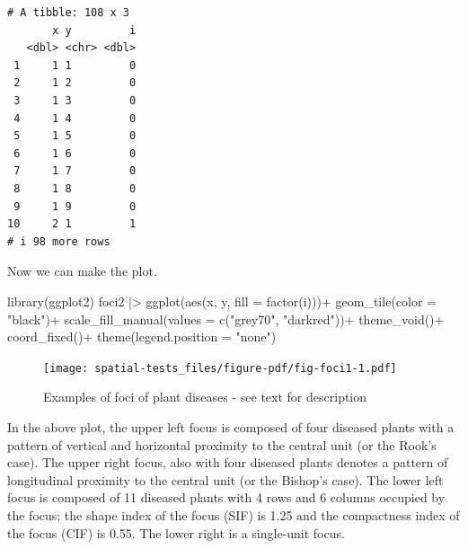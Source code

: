 \documentclass[
  letterpaper,
]{book}
\newenvironment{Shaded}{\begin{snugshade}}{\end{snugshade}}
\newcommand{\AttributeTok}[1]{\textcolor[rgb]{0.40,0.45,0.13}{#1}}
\newcommand{\FunctionTok}[1]{\textcolor[rgb]{0.28,0.35,0.67}{#1}}
\newcommand{\NormalTok}[1]{\textcolor[rgb]{0.00,0.23,0.31}{#1}}
\newcommand{\SpecialCharTok}[1]{\textcolor[rgb]{0.37,0.37,0.37}{#1}}
\newcommand{\StringTok}[1]{\textcolor[rgb]{0.13,0.47,0.30}{#1}}
\begin{document}
\begin{verbatim}
# A tibble: 108 x 3
       x y         i
   <dbl> <chr> <dbl>
 1     1 1         0
 2     1 2         0
 3     1 3         0
 4     1 4         0
 5     1 5         0
 6     1 6         0
 7     1 7         0
 8     1 8         0
 9     1 9         0
10     2 1         1
# i 98 more rows
\end{verbatim}

Now we can make the plot.

\begin{Shaded}
\begin{Highlighting}[]
\FunctionTok{library}\NormalTok{(ggplot2)}
\NormalTok{foci2 }\SpecialCharTok{|\textgreater{}} 
  \FunctionTok{ggplot}\NormalTok{(}\FunctionTok{aes}\NormalTok{(x, y, }\AttributeTok{fill =} \FunctionTok{factor}\NormalTok{(i)))}\SpecialCharTok{+}
  \FunctionTok{geom\_tile}\NormalTok{(}\AttributeTok{color =} \StringTok{"black"}\NormalTok{)}\SpecialCharTok{+}
  \FunctionTok{scale\_fill\_manual}\NormalTok{(}\AttributeTok{values =} \FunctionTok{c}\NormalTok{(}\StringTok{"grey70"}\NormalTok{, }\StringTok{"darkred"}\NormalTok{))}\SpecialCharTok{+}
  \FunctionTok{theme\_void}\NormalTok{()}\SpecialCharTok{+}
  \FunctionTok{coord\_fixed}\NormalTok{()}\SpecialCharTok{+}
  \FunctionTok{theme}\NormalTok{(}\AttributeTok{legend.position =} \StringTok{"none"}\NormalTok{)}
\end{Highlighting}
\end{Shaded}

\begin{figure}[H]

{\centering \texttt{[image: spatial-tests\_files/figure-pdf/fig-foci1-1.pdf]}

}

\caption{\label{fig-foci1}Examples of foci of plant diseases - see text
for description}

\end{figure}

In the above plot, the upper left focus is composed of four diseased
plants with a pattern of vertical and horizontal proximity to the
central unit (or the Rook's case). The upper right focus, also with four
diseased plants denotes a pattern of longitudinal proximity to the
central unit (or the Bishop's case). The lower left focus is composed of
11 diseased plants with 4 rows and 6 columns occupied by the focus; the
shape index of the focus (SIF) is 1.25 and the compactness index of the
focus (CIF) is 0.55. The lower right is a single-unit focus.
\end{document}

